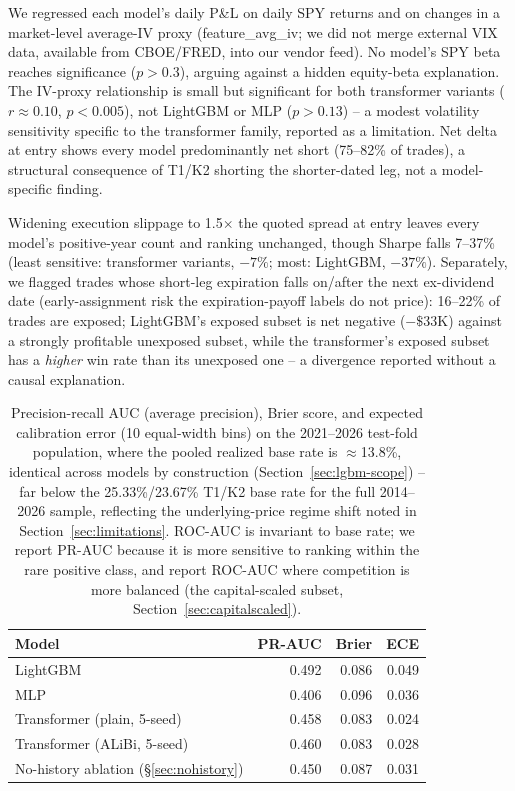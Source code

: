 \documentclass[sigconf,review]{acmart}
\begin{document}
We regressed each model's daily P\&L on daily SPY returns and on changes in a market-level average-IV proxy (feature\_avg\_iv; we did not merge external VIX data, available from CBOE/FRED, into our vendor feed). No model's SPY beta reaches significance ($p>0.3$), arguing against a hidden equity-beta explanation. The IV-proxy relationship is small but significant for both transformer variants ($r\approx0.10$, $p<0.005$), not LightGBM or MLP ($p>0.13$) -- a modest volatility sensitivity specific to the transformer family, reported as a limitation. Net delta at entry shows every model predominantly net short (75--82\% of trades), a structural consequence of T1/K2 shorting the shorter-dated leg, not a model-specific finding.

Widening execution slippage to 1.5$\times$ the quoted spread at entry leaves every model's positive-year count and ranking unchanged, though Sharpe falls 7--37\% (least sensitive: transformer variants, $-7\%$; most: LightGBM, $-37\%$). Separately, we flagged trades whose short-leg expiration falls on/after the next ex-dividend date (early-assignment risk the expiration-payoff labels do not price): 16--22\% of trades are exposed; LightGBM's exposed subset is net negative ($-\$33$K) against a strongly profitable unexposed subset, while the transformer's exposed subset has a \emph{higher} win rate than its unexposed one -- a divergence reported without a causal explanation.

\begin{table}[t]
\footnotesize
\begin{tabular}{lrrr}
\toprule
Model & PR-AUC & Brier & ECE \\
\midrule
LightGBM & 0.492 & 0.086 & 0.049 \\
MLP & 0.406 & 0.096 & 0.036 \\
Transformer (plain, 5-seed) & 0.458 & 0.083 & 0.024 \\
Transformer (ALiBi, 5-seed) & 0.460 & 0.083 & 0.028 \\
No-history ablation (\S\ref{sec:nohistory}) & 0.450 & 0.087 & 0.031 \\
\bottomrule
\end{tabular}
\caption{Precision-recall AUC (average precision), Brier score, and expected calibration error (10 equal-width bins) on the 2021--2026 test-fold population, where the pooled realized base rate is $\approx$13.8\%, identical across models by construction (Section~\ref{sec:lgbm-scope}) -- far below the 25.33\%/23.67\% T1/K2 base rate for the full 2014--2026 sample, reflecting the underlying-price regime shift noted in Section~\ref{sec:limitations}. ROC-AUC is invariant to base rate; we report PR-AUC because it is more sensitive to ranking within the rare positive class, and report ROC-AUC where competition is more balanced (the capital-scaled subset, Section~\ref{sec:capitalscaled}).}
\label{tab:calibration}
\end{table}
\end{document}
